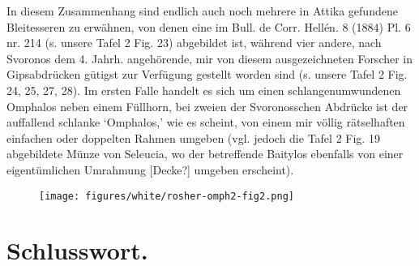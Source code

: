 \documentclass[a4paper, 11pt, oneside]{article}
\begin{document}
In diesem Zusammenhang sind endlich auch noch mehrere in Attika gefundene Bleitesseren zu erwähnen, von denen eine im Bull. de Corr. Hellén. 8 (1884) Pl. 6 nr. 214 (s. unsere Tafel 2 Fig. 23) abgebildet ist, während vier andere, nach Svoronos dem 4. Jahrh. angehörende, mir von diesem ausgezeichneten Forscher in Gipsabdrücken gütigst zur Verfügung gestellt worden sind (s. unsere Tafel 2 Fig. 24, 25, 27, 28). Im ersten Falle handelt es sich um einen schlangenumwundenen Omphalos neben einem Füllhorn, bei zweien der Svoronosschen Abdrücke ist der auffallend schlanke `Omphalos,' wie es scheint, von einem mir völlig rätselhaften einfachen oder doppelten Rahmen umgeben (vgl. jedoch die Tafel 2 Fig. 19 abgebildete Münze von Seleucia, wo der betreffende Baitylos ebenfalls von einer eigentümlichen Umrahmung [Decke?] umgeben erscheint).
\begin{figure}[H]
\centering
\texttt{[image: figures/white/rosher-omph2-fig2.png]}
\caption{}
\end{figure}
\clearpage
\section{Schlusswort.}
\end{document}

